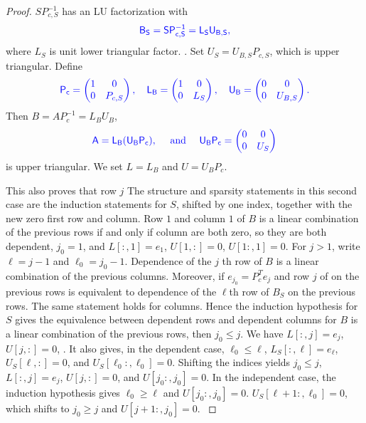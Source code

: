 \documentclass[10pt,twoside]{siamart1116}
\numberwithin{theorem}{section}
\providecommand{\DIFadd}[1]{{\protect\color{blue} \sf #1}} %
\providecommand{\DIFdel}[1]{{\protect\color{red} \scriptsize #1}} %
\providecommand{\DIFaddbegin}{} %
\providecommand{\DIFaddend}{} %
\providecommand{\DIFdelbegin}{} %
\providecommand{\DIFdelend}{} %
\begin{document}
\begin{proof}
  \DIFdelbegin \DIFdel{$S P_{c,S}^{-1}$ has an LU factorization with }\DIFdelend \DIFaddbegin \[
    \DIFadd{B_S = S P_{c,S}^{-1} = L_S U_{B,S},
  }\]
  \DIFadd{where $L_S$ is }\DIFaddend unit lower triangular\DIFdelbegin \DIFdel{factor. }\DIFdelend \DIFaddbegin \DIFadd{. Set $U_S = U_{B,S}P_{c,S}$, which is upper triangular. Define
  }\[
    \DIFadd{P_c =
    \begin{pmatrix}
      1 & 0       \\
      0 & P_{c,S}
    \end{pmatrix}, \quad
    L_B =
    \begin{pmatrix}
      1 & 0   \\
      0 & L_S
    \end{pmatrix}, \quad
    U_B =
    \begin{pmatrix}
      0 & 0       \\
      0 & U_{B,S}
    \end{pmatrix}.
  }\]
  \DIFadd{Then $B = A P_c^{-1}=L_B U_B$,
  }\[
    \DIFadd{A = L_B(U_B P_c), \quad \text{ and } \quad
    U_B P_c =
    \begin{pmatrix}
      0 & 0   \\
      0 & U_S
    \end{pmatrix}
  }\]
  \DIFadd{is upper triangular. We set $L=L_B$ and $U=U_B P_c$.
}\DIFaddend 

  \DIFdelbegin \DIFdel{This also proves that row $j$ }\DIFdelend \DIFaddbegin \DIFadd{The structure and sparsity statements in this second case are the induction statements for $S$, shifted by one index, together with the new zero first row and column. Row $1$ and column $1$ }\DIFaddend of $B$ \DIFdelbegin \DIFdel{is a linear combination of the previous rows if and only if column }\DIFdelend \DIFaddbegin \DIFadd{are both zero, so they are both dependent, $j_0=1$, and $L[:,1]=e_1$, $U[1,:]=0$, $U[1:,1]=0$. For $j>1$, write $\ell=j-1$ and $\ell_0=j_0-1$. Dependence of the }\DIFaddend $j$\DIFaddbegin \DIFadd{th row }\DIFaddend of $B$ \DIFdelbegin \DIFdel{is a linear combination of the previous columns. Moreover, if $e_{j_0} = P_c^T e_j$ and row $j$ of }\DIFdelend \DIFaddbegin \DIFadd{on the previous rows is equivalent to dependence of the $\ell$th row of $B_S$ on the previous rows. The same statement holds for columns. Hence the induction hypothesis for $S$ gives the equivalence between dependent rows and dependent columns for }\DIFaddend $B$\DIFdelbegin \DIFdel{is a linear combination of the previous rows, then $j_0 \le j$. We have $L[:,j] = e_j$, $U[j,:] = 0$, }\DIFdelend \DIFaddbegin \DIFadd{. It also gives, in the dependent case, $\ell_0\le \ell$, $L_S[:,\ell]=e_\ell$, $U_S[\ell,:]=0$, and $U_S[\ell_0:,\ell_0]=0$. Shifting the indices yields $j_0\le j$, $L[:,j]=e_j$, $U[j,:]=0$, and $U[j_0:,j_0]=0$. In the independent case, the induction hypothesis gives $\ell_0\ge\ell$ }\DIFaddend and \DIFdelbegin \DIFdel{$U[j_0:,j_0] = 0$. }\DIFdelend \DIFaddbegin \DIFadd{$U_S[\ell+1:,\ell_0]=0$, which shifts to $j_0\ge j$ and $U[j+1:,j_0]=0$.
}\DIFaddend 


\end{proof}
\end{document}
